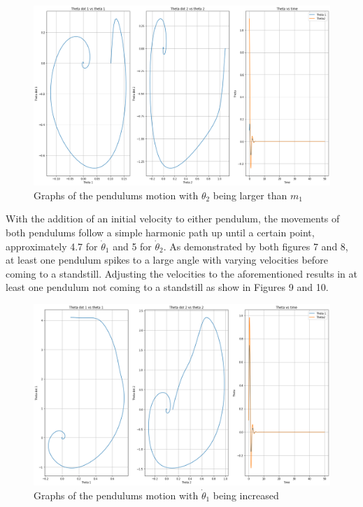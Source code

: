 \documentclass[linenumbers,RNAAS,trackchanges]{aastex631}
\begin{document}
\begin{figure}[H]
    \centering
    \centering
    \includegraphics[scale=.30]{theta2.png}
    \caption{Graphs of the pendulums motion with $\theta_2$ being larger than $m_1$}
    \label{fig:code}
\end{figure}
With the addition of an initial velocity to either pendulum, the movements of both pendulums follow a simple harmonic path up until a certain point, approximately 4.7 for $\dot\theta_1$ and 5 for $\dot\theta_2$. As demonstrated by both figures 7 and 8, at least one pendulum spikes to a large angle with varying velocities before coming to a standstill. Adjusting the velocities to the aforementioned results in at least one pendulum not coming to a standstill as show in Figures 9 and 10.
\begin{figure}[H]
    \centering
    \centering
    \includegraphics[scale=.30]{td1.png}
    \caption{Graphs of the pendulums motion with $\dot\theta_1$ being increased}
    \label{fig:code}
\end{figure}
\end{document}
